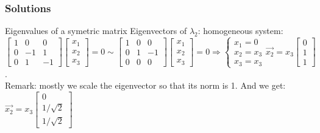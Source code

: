 \begin{frame}
	\frametitle{Solutions}
	\begin{block}{Eigenvalues of a symetric matrix}
		Eigenvectors of $\lambda_2$: homogeneous system:\\
		$\begin{bmatrix}
		1 & 0& 0\\
		0 & -1 & 1\\
		0 & 1 & -1
		\end{bmatrix}\begin{bmatrix}
		x_1\\x_2\\x_3
		\end{bmatrix}=0 \sim \begin{bmatrix}
		1 & 0& 0\\
		0 & 1 & -1\\
		0 & 0 & 0
		\end{bmatrix}\begin{bmatrix}
		x_1\\x_2\\x_3
		\end{bmatrix}=0 \Rightarrow \begin{cases}
		x_1=0\\x_2=x_3\\x_3=x_3
		\end{cases} \overrightarrow{x_2}=x_3\begin{bmatrix}
		0\\1\\1
		\end{bmatrix}$. \\
		Remark: mostly we scale the eigenvector so that its norm is 1. And we get: $\overrightarrow{x_2}=x_3\begin{bmatrix}
		0\\1/\sqrt{2}\\1/\sqrt{2}
		\end{bmatrix}$
	\end{block}
\end{frame}

